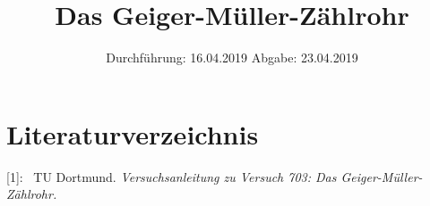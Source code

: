 

\subject{Nr.703}
\title{Das Geiger-Müller-Zählrohr}
\date{%
  Durchführung: 16.04.2019
  \hspace{3em}
  Abgabe: 23.04.2019
}



\maketitle
\thispagestyle{empty}
\tableofcontents
\newpage






\printbibliography{}

\section{Literaturverzeichnis}

[1]: \ TU Dortmund. \textit{Versuchsanleitung zu Versuch 703:
Das Geiger-Müller-Zählrohr.}\newline



